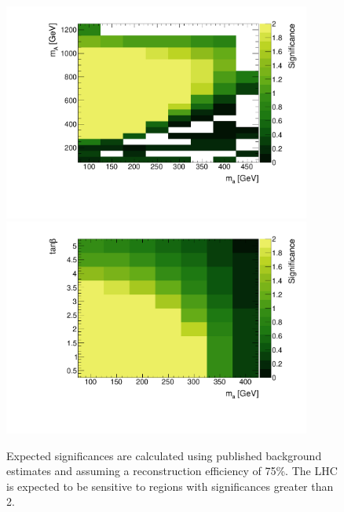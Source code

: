 \begin{figure}
\centering
\includegraphics[width=0.9\textwidth]{texinputs/04_grid/figures/monoz/leptonic/mAma_Significance_ll.pdf}
\includegraphics[width=0.9\textwidth]{texinputs/04_grid/figures/monoz/leptonic/tanbma_Significance_ll.pdf}
\caption{Expected significances are calculated using published background estimates and assuming a reconstruction efficiency of 75\%.  The LHC is expected to be sensitive to regions with significances greater than 2.}
\label{fig:expected_significance_monozll}
\end{figure}

